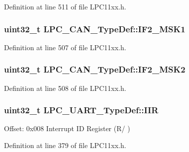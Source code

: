 Definition at line 511 of file L\+P\+C11xx.\+h.

\subsubsection[{\texorpdfstring{I\+F2\+\_\+\+M\+S\+K1}{IF2_MSK1}}]{ uint32\+\_\+t L\+P\+C\+\_\+\+C\+A\+N\+\_\+\+Type\+Def\+::\+I\+F2\+\_\+\+M\+S\+K1}\hypertarget{group___l_p_c11xx___definitions_ga4e085765bc1424bcda239e5c98c9f183}{}\label{group___l_p_c11xx___definitions_ga4e085765bc1424bcda239e5c98c9f183}


Definition at line 507 of file L\+P\+C11xx.\+h.

\subsubsection[{\texorpdfstring{I\+F2\+\_\+\+M\+S\+K2}{IF2_MSK2}}]{ uint32\+\_\+t L\+P\+C\+\_\+\+C\+A\+N\+\_\+\+Type\+Def\+::\+I\+F2\+\_\+\+M\+S\+K2}\hypertarget{group___l_p_c11xx___definitions_gae8c1675d6e43b7ddf76fdcadb83e3d7b}{}\label{group___l_p_c11xx___definitions_gae8c1675d6e43b7ddf76fdcadb83e3d7b}


Definition at line 508 of file L\+P\+C11xx.\+h.

\subsubsection[{\texorpdfstring{I\+IR}{IIR}}]{ uint32\+\_\+t L\+P\+C\+\_\+\+U\+A\+R\+T\+\_\+\+Type\+Def\+::\+I\+IR}\hypertarget{group___l_p_c11xx___definitions_ga360b5c67d6e31dd5f6a9c6f3ad57b8a0}{}\label{group___l_p_c11xx___definitions_ga360b5c67d6e31dd5f6a9c6f3ad57b8a0}
Offset\+: 0x008 Interrupt ID Register (R/ ) 

Definition at line 379 of file L\+P\+C11xx.\+h.

